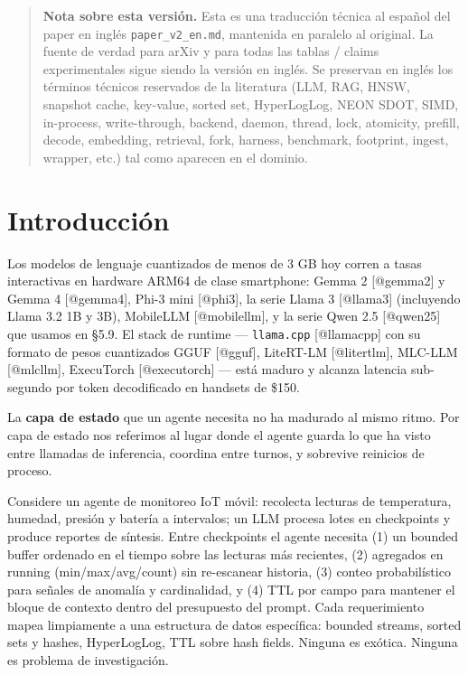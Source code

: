 \begin{quote}
\textbf{Nota sobre esta versión.} Esta es una traducción técnica al español del
paper en inglés \texttt{paper\_v2\_en.md}, mantenida en paralelo al original. La
fuente de verdad para arXiv y para todas las tablas / claims experimentales
sigue siendo la versión en inglés. Se preservan en inglés los términos técnicos
reservados de la literatura (LLM, RAG, HNSW, snapshot cache, key-value, sorted
set, HyperLogLog, NEON SDOT, SIMD, in-process, write-through, backend, daemon,
thread, lock, atomicity, prefill, decode, embedding, retrieval, fork, harness,
benchmark, footprint, ingest, wrapper, etc.) tal como aparecen en el dominio.
\end{quote}

\section{Introducción}\label{introducciuxf3n}

Los modelos de lenguaje cuantizados de menos de 3 GB hoy corren a tasas
interactivas en hardware ARM64 de clase smartphone: Gemma 2 {[}@gemma2{]} y
Gemma 4 {[}@gemma4{]}, Phi-3 mini {[}@phi3{]}, la serie Llama 3 {[}@llama3{]}
(incluyendo Llama 3.2 1B y 3B), MobileLLM {[}@mobilellm{]}, y la serie Qwen 2.5
{[}@qwen25{]} que usamos en §5.9. El stack de runtime --- \texttt{llama.cpp}
{[}@llamacpp{]} con su formato de pesos cuantizados GGUF {[}@gguf{]}, LiteRT-LM
{[}@litertlm{]}, MLC-LLM {[}@mlcllm{]}, ExecuTorch {[}@executorch{]} --- está
maduro y alcanza latencia sub-segundo por token decodificado en handsets de
\$150.

La \textbf{capa de estado} que un agente necesita no ha madurado al mismo ritmo.
Por capa de estado nos referimos al lugar donde el agente guarda lo que ha visto
entre llamadas de inferencia, coordina entre turnos, y sobrevive reinicios de
proceso.

Considere un agente de monitoreo IoT móvil: recolecta lecturas de temperatura,
humedad, presión y batería a intervalos; un LLM procesa lotes en checkpoints y
produce reportes de síntesis. Entre checkpoints el agente necesita (1) un
bounded buffer ordenado en el tiempo sobre las lecturas más recientes, (2)
agregados en running (min/max/avg/count) sin re-escanear historia, (3) conteo
probabilístico para señales de anomalía y cardinalidad, y (4) TTL por campo para
mantener el bloque de contexto dentro del presupuesto del prompt. Cada
requerimiento mapea limpiamente a una estructura de datos específica: bounded
streams, sorted sets y hashes, HyperLogLog, TTL sobre hash fields. Ninguna es
exótica. Ninguna es problema de investigación.

